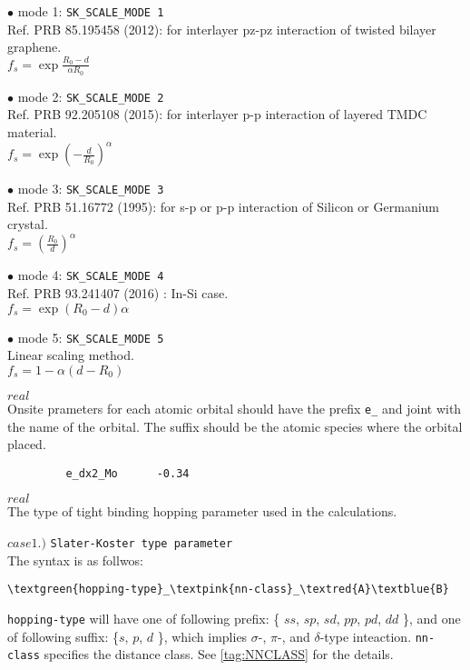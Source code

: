 \documentclass[a4paper,12pt]{scrartcl}
\makeatletter
\def\namedlabel#1#2{\begingroup
    #2%
    \def\@currentlabel{#2}%
    \phantomsection\label{#1}\endgroup
}
\newcommand{\textred}[1]{\textcolor{red!85!white}{\texttt{#1}}}
\newcommand{\textblue}[1]{\textcolor{blue!85!white}{\texttt{#1}}}
\newcommand{\textgreen}[1]{\textcolor{green!50!black}{\texttt{#1}}}
\newcommand{\textpink}[1]{\textcolor{red!60!yellow}{\texttt{#1}}}
\makeatother
\begin{document}
\begin{description}
		\item $\bullet$ mode 1: \texttt{SK\_SCALE\_MODE 1} \\
		 Ref. PRB 85.195458 (2012): for interlayer pz-pz interaction of twisted bilayer graphene. \\
		  $f_s = \exp{ \frac{R_0 - d}{\alpha R_0} }$ 
		\item $\bullet$ mode 2: \texttt{SK\_SCALE\_MODE 2} \\
		 Ref. PRB 92.205108 (2015): for interlayer p-p interaction of layered TMDC material. \\
		  $f_s = \exp{ (-\frac{d}{R_0})^\alpha }$ 
		\item $\bullet$ mode 3: \texttt{SK\_SCALE\_MODE 3} \\
		 Ref. PRB 51.16772 (1995): for s-p or p-p interaction of Silicon or Germanium crystal. \\
		  $f_s = (\frac{R_0}{d})^\alpha$ 
		\item $\bullet$ mode 4: \texttt{SK\_SCALE\_MODE 4} \\
		 Ref. PRB 93.241407 (2016) : In-Si case. \\
		  $f_s = \exp ({R_0 - d})\alpha$ 
		\item $\bullet$ mode 5: \texttt{SK\_SCALE\_MODE 5} \\
		 Linear scaling method. \\
		  $f_s = 1 - \alpha (d - R_0)$ 
		
    \item[\namedlabel{tag:param-onsite}{ONSITE parameters}] $real$ \\
		Onsite prameters for each atomic orbital should have the prefix
		\textgreen{e\_} and joint with the name of the orbital. The suffix
		should be the atomic species where the orbital placed.
        \begin{verbatim}
         e_dx2_Mo      -0.34
        \end{verbatim}

    \item[\namedlabel{tag:hopping_type}{HOPPING parameters type}] $real$ \\
        The type of tight binding hopping parameter used in the calculations.

		\subitem $case 1.)$ \texttt{Slater-Koster type parameter} \\
		 The syntax is as follwos:
        \begin{Verbatim}[commandchars=\\\{\}]
         \textgreen{hopping-type}_\textpink{nn-class}_\textred{A}\textblue{B}
        \end{Verbatim}
		\texttt{hopping-type} will have one of following prefix: \{ $ss$, $sp$, $sd$, $pp$, 
		$pd$, $dd$ \}, and one of following suffix: \{$s$, $p$, $d$ \}, which implies
		$\sigma$-, $\pi$-, and $\delta$-type inteaction.
		\textpink{nn-class} specifies the distance class. See \ref{tag:NNCLASS} for the 
		details.


\end{description}
\end{document}
